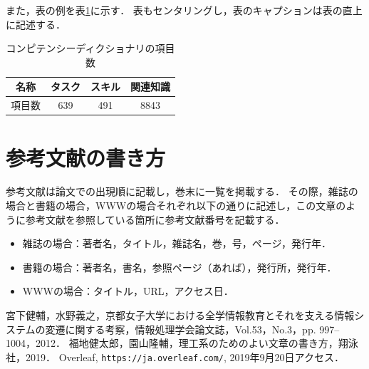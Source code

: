 \documentclass[a4paper,twocolumn,10pt]{ltjsarticle}
\begin{document}
また，表の例を表\ref{tab:competency}に示す．
表もセンタリングし，表のキャプションは表の直上に記述する．

\begin{table}[htb]
 \begin{center}
  \caption{コンピテンシーディクショナリの項目数}
  \label{tab:competency}
  \begin{tabular}{cccc}
   \hline
   名称 & タスク & スキル & 関連知識\\
   \hline
   項目数 & 639 & 491 & 8843\\
   \hline
  \end{tabular}
 \end{center}
\end{table}

\section{参考文献の書き方}

参考文献は論文での出現順に記載し，巻末に一覧を掲載する．
その際，雑誌の場合\cite{refjournal}と書籍の場合\cite{refbook}，WWWの場合\cite{refwww}それぞれ以下の通りに記述し，この文章のように参考文献を参照している箇所に参考文献番号を記載する．

\begin{itemize}
 \item 雑誌の場合：著者名，タイトル，雑誌名，巻，号，ページ，発行年．
 \item 書籍の場合：著者名，書名，参照ページ（あれば），発行所，発行年．
 \item WWWの場合：タイトル，URL，アクセス日．
\end{itemize}

\begin{thebibliography}{99}
  宮下健輔，水野義之，京都女子大学における全学情報教育とそれを支える情報システムの変遷に関する考察，情報処理学会論文誌，Vol.53，No.3，pp. 997--1004，2012．
   福地健太郎，園山隆輔，理工系のためのよい文章の書き方，翔泳社，2019．
  Overleaf, {\tt https://ja.overleaf.com/}, 2019年9月20日アクセス．
\end{thebibliography}
\end{document}
